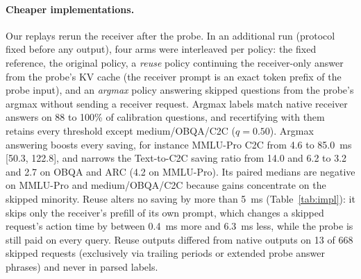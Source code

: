 \paragraph{Cheaper implementations.} Our replays rerun the receiver after the probe. In an additional run (protocol fixed before any output), four arms were interleaved per policy: the fixed reference, the original policy, a \emph{reuse} policy continuing the receiver-only answer from the probe's KV cache (the receiver prompt is an exact token prefix of the probe input), and an \emph{argmax} policy answering skipped questions from the probe's argmax without sending a receiver request. Argmax labels match native receiver answers on 88 to 100\% of calibration questions, and recertifying with them retains every threshold except medium/OBQA/C2C ($q=0.50$). Argmax answering boosts every saving, for instance MMLU-Pro C2C from 4.6 to 85.0~ms [50.3, 122.8], and narrows the Text-to-C2C saving ratio from 14.0 and 6.2 to 3.2 and 2.7 on OBQA and ARC (4.2 on MMLU-Pro). Its paired medians are negative on MMLU-Pro and medium/OBQA/C2C because gains concentrate on the skipped minority. Reuse alters no saving by more than 5~ms (Table~\ref{tab:impl}): it skips only the receiver's prefill of its own prompt, which changes a skipped request's action time by between 0.4~ms more and 6.3~ms less, while the probe is still paid on every query. Reuse outputs differed from native outputs on 13 of 668 skipped requests (exclusively via trailing periods or extended probe answer phrases) and never in parsed labels.


